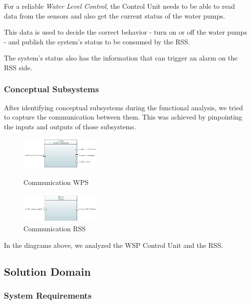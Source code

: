 \documentclass[11pt]{article}
\begin{document}
For a reliable \textit{Water Level Control}, the Control Unit needs to be able to read data from the sensors and also get the current status of the water pumps.

This data is used to decide the correct behavior - turn on or off the water pumps - and publish the system's status to be consumed by the RSS.

The system's status also has the information that can trigger an alarm on the RSS side.

\subsubsection{Conceptual Subsystems}

After identifying conceptual subsystems during the functional analysis, we tried to capture the communication between them. This was achieved by pinpointing  the inputs and outputs of those subsystems.

\begin{figure}[H]
\centering
\begin{minipage}{.5\linewidth}
  \centering
  \includegraphics[width=150px]{../diagrams/conceptual-subsystem-communication-wps.png}
  \caption{Communication WPS}
  \label{fig:Conceptual Subsystem 1}
\end{minipage}%
\begin{minipage}{.5\linewidth}
  \centering
  \includegraphics[width=150px]{../diagrams/conceptual-subsystem-communication-rss.png}
  \caption{Communication RSS}
  \label{fig:Conceptual Subsystem 2}
\end{minipage}
\end{figure}

In the diagrams above, we analyzed the WSP Control Unit and the RSS.

\subsection{Solution Domain}

\subsubsection{System Requirements}
\end{document}
